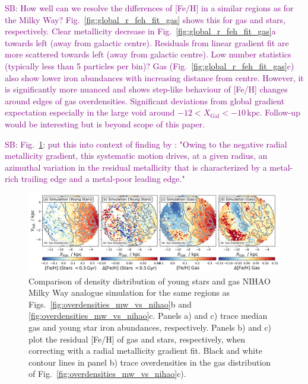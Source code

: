 \documentclass[fleqn,usenatbib]{mnras}
\newcommand{\SB}[1]{{\textcolor{purple}{SB: #1}}}
\begin{document}
\SB{How well can we resolve the differences of [Fe/H] in a similar regions as for the Milky Way? Fig.~\ref{fig:global_r_feh_fit_gas} shows this for gas and stars, respectively. Clear metallicity decrease in Fig.~\ref{fig:global_r_feh_fit_gas}a towards left (away from galactic centre). Residuals from linear gradient fit are more scattered towards left (away from galactic centre). Low number statistics (typically less than 5 particles per bin)? Gas (Fig.~\ref{fig:global_r_feh_fit_gas}c) also show lower iron abundances with increasing distance from centre. However, it is significantly more nuanced and shows step-like behaviour of [Fe/H] changes around edges of gas overdensities. Significant deviations from global gradient expectation especially in the large void around $-12 < X_\mathrm{Gal} < -10\,\mathrm{kpc}$. Follow-up would be interesting but is beyond scope of this paper.}

\SB{Fig.~\ref{fig:nihao_gas_stars_density_overlay}: put this into context of finding by \citet{Grand2016}: "Owing to the negative radial metallicity gradient, this systematic motion drives, at a given radius, an azimuthal variation in the residual metallicity that is characterized by a metal-rich trailing edge and a metal-poor leading edge."}

\begin{figure}
    \centering
    \includegraphics[width=\textwidth]{figures/nihao_gas_stars_density_overlay.png}
    \caption{Comparison of density distribution of young stars and gas NIHAO Milky Way analogue simulation for the same regions as Figs.~\ref{fig:overdensities_mw_vs_nihao}b and \ref{fig:overdensities_mw_vs_nihao}c. Panels a) and c) trace median gas and young star iron abundances, respectively. Panels b) and c) plot the residual [Fe/H] of gas and stars, respectively, when correcting with a radial metallicity gradient fit. Black and white contour lines in panel b) trace overdensities in the gas distribution of Fig.~\ref{fig:overdensities_mw_vs_nihao}c).}
    \label{fig:nihao_gas_stars_density_overlay}
\end{figure}
\end{document}
